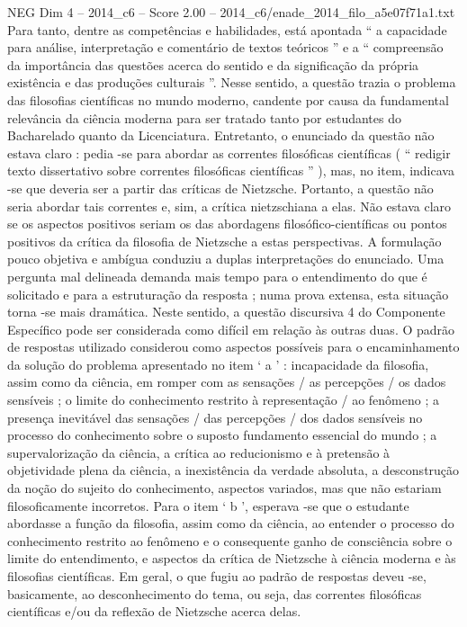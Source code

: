 \begin{textsample}{NEG Dim 4 – 2014\_c6 – Score 2.00 – 2014\_c6/enade\_2014\_filo\_a5e07f71a1.txt}
Para tanto, dentre as competências e habilidades, está apontada “ a capacidade para análise, interpretação e comentário de textos teóricos ” e a “ compreensão da importância das questões acerca do sentido e da significação da própria existência e das produções culturais ”.
Nesse sentido, a questão trazia o problema das filosofias científicas no mundo moderno, candente por causa da fundamental relevância da ciência moderna para ser tratado tanto por estudantes do Bacharelado quanto da Licenciatura.
Entretanto, o enunciado da questão não estava claro : pedia -se para abordar as correntes filosóficas científicas ( “ redigir texto dissertativo sobre correntes filosóficas científicas ” ), mas, no item, indicava -se que deveria ser a partir das críticas de Nietzsche.
Portanto, a questão não seria abordar tais correntes e, sim, a crítica nietzschiana a elas.
Não estava claro se os aspectos positivos seriam os das abordagens filosófico-científicas ou pontos positivos da crítica da filosofia de Nietzsche a estas perspectivas.
A formulação pouco objetiva e ambígua conduziu a duplas interpretações do enunciado.
Uma pergunta mal delineada demanda mais tempo para o entendimento do que é solicitado e para a estruturação da resposta ; numa prova extensa, esta situação torna -se mais dramática.
Neste sentido, a questão discursiva 4 do Componente Específico pode ser considerada como difícil em relação às outras duas.
O padrão de respostas utilizado considerou como aspectos possíveis para o encaminhamento da solução do problema apresentado no item ‘ a ’ : incapacidade da filosofia, assim como da ciência, em romper com as sensações / as percepções / os dados sensíveis ; o limite do conhecimento restrito à representação / ao fenômeno ; a presença inevitável das sensações / das percepções / dos dados sensíveis no processo do conhecimento sobre o suposto fundamento essencial do mundo ; a supervalorização da ciência, a crítica ao reducionismo e à pretensão à objetividade plena da ciência, a inexistência da verdade absoluta, a desconstrução da noção do sujeito do conhecimento, aspectos variados, mas que não estariam filosoficamente incorretos.
Para o item ‘ b ’, esperava -se que o estudante abordasse a função da filosofia, assim como da ciência, ao entender o processo do conhecimento restrito ao fenômeno e o consequente ganho de consciência sobre o limite do entendimento, e aspectos da crítica de Nietzsche à ciência moderna e às filosofias científicas.
Em geral, o que fugiu ao padrão de respostas deveu -se, basicamente, ao desconhecimento do tema, ou seja, das correntes filosóficas científicas e/ou da reflexão de Nietzsche acerca delas.

\end{textsample}

